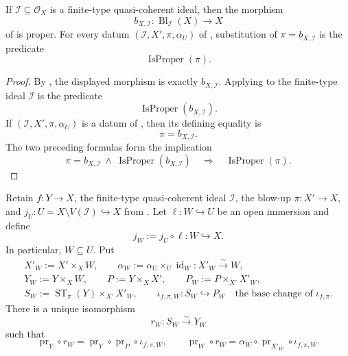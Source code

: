 \begin{lemma}
  \label{lemma:nagata-blowup-proper}
  \lean{}

  If $\mathcal I\subseteq\mathcal O_X$ is a finite-type quasi-coherent ideal,
  then the morphism
  \[
    b_{X,\mathcal I}\colon\operatorname{Bl}_{\mathcal I}(X)\to X
  \]
  of  is proper.  For every datum
  $(\mathcal I,X',\pi,\alpha_U)$ of
  , substitution of
  $\pi=b_{X,\mathcal I}$ is the predicate
  \[
    \operatorname{IsProper}(\pi).
  \]
\end{lemma}

\begin{proof}
  By , the displayed morphism is exactly
  $b_{X,\mathcal I}$.  Applying
   to the finite-type ideal
  $\mathcal I$ is the predicate
  \[
    \operatorname{IsProper}(b_{X,\mathcal I}).
  \]
  If $(\mathcal I,X',\pi,\alpha_U)$ is a datum of
  , then its defining equality is
  \[
    \pi=b_{X,\mathcal I}.
  \]
  The two preceding formulas form the implication
  \[
    \pi=b_{X,\mathcal I}
      \ \wedge\ 
    \operatorname{IsProper}(b_{X,\mathcal I})
      \quad\Longrightarrow\quad
    \operatorname{IsProper}(\pi).
  \]
\end{proof}

\begin{lemma}
  \label{lemma:nagata-strict-transform-restrict}
  \lean{}

  Retain $f\colon Y\to X$, the finite-type quasi-coherent ideal
  $\mathcal I$, the blow-up $\pi\colon X'\to X$, and
  $j_U\colon U=X\setminus V(\mathcal I)\hookrightarrow X$ from
  .  Let
  $\ell\colon W\hookrightarrow U$ be an open immersion and define
  \[
    j_W:=j_U\circ\ell\colon W\hookrightarrow X.
  \]
  In particular, $W\subseteq U$.  Put
  \[
  \begin{gathered}
    X'_W:=X'\times_XW,\qquad
    \alpha_W:=\alpha_U\times_U\operatorname{id}_W
      \colon X'_W\xrightarrow{\sim}W,\\
    Y_W:=Y\times_XW,\qquad
    P:=Y\times_XX',\qquad
    P_W:=P\times_{X'}X'_W,\\
    S_W:=\operatorname{ST}_\pi(Y)\times_{X'}X'_W,\qquad
    \iota_{f,\pi,W}\colon S_W\hookrightarrow P_W
      \quad\text{the base change of }\iota_{f,\pi}.
  \end{gathered}                                                   \tag{SR1}
  \]
  There is a unique isomorphism
  \[
    r_W\colon S_W\xrightarrow{\sim}Y_W
  \]
  such that
  \[
    \operatorname{pr}_Y\circ r_W
      =\operatorname{pr}_Y\circ\operatorname{pr}_P\circ
        \iota_{f,\pi,W},
    \qquad
    \operatorname{pr}_W\circ r_W
      =\alpha_W\circ\operatorname{pr}_{X'_W}\circ
        \iota_{f,\pi,W}.
  \]
\end{lemma}

